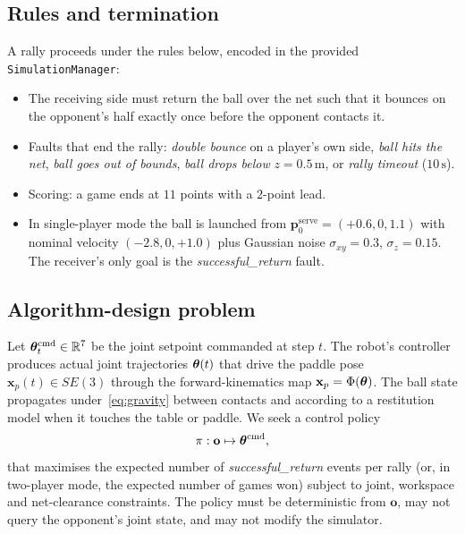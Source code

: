 \subsection{Rules and termination}

A rally proceeds under the rules below, encoded in the provided
\texttt{SimulationManager}:
\begin{itemize}
  \item The receiving side must return the ball over the net such that it
        bounces on the opponent's half exactly once before the opponent
        contacts it.
  \item Faults that end the rally:
        \emph{double bounce} on a player's own side,
        \emph{ball hits the net},
        \emph{ball goes out of bounds},
        \emph{ball drops below} $z=0.5\,\mathrm{m}$,
        or \emph{rally timeout} ($10\,\mathrm{s}$).
  \item Scoring: a game ends at $11$ points with a $2$-point lead.
  \item In single-player mode the ball is launched from
        $\mathbf{p}_{0}^{\mathrm{serve}}=(+0.6,0,1.1)$ with nominal
        velocity $(-2.8,0,+1.0)$ plus Gaussian noise
        $\sigma_{xy}=0.3$, $\sigma_{z}=0.15$. The receiver's only goal
        is the \emph{successful\_return} fault.
\end{itemize}

\subsection{Algorithm-design problem}

Let $\boldsymbol{\theta}^{\mathrm{cmd}}_{t}\in\mathbb{R}^{7}$ be the joint setpoint commanded at
step $t$. The robot's controller produces actual joint trajectories
$\boldsymbol{\theta}(t)$ that drive the paddle pose
$\mathbf{x}_{p}(t)\in SE(3)$ through the forward-kinematics map
$\mathbf{x}_{p}=\Phi(\boldsymbol{\theta})$. The ball state propagates under~\eqref{eq:gravity}
between contacts and according to a restitution model when it touches the
table or paddle. We seek a control policy
\begin{equation}
  \pi:\mathbf{o}\mapsto\boldsymbol{\theta}^{\mathrm{cmd}},
  \label{eq:policy}
\end{equation}
that maximises the expected number of \emph{successful\_return} events per
rally (or, in two-player mode, the expected number of games won) subject
to joint, workspace and net-clearance constraints. The policy must be
deterministic from $\mathbf{o}$, may not query the opponent's joint state,
and may not modify the simulator.

